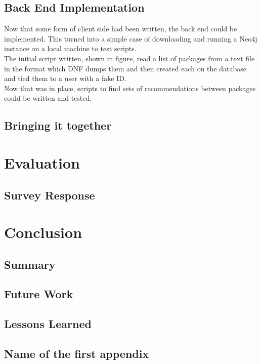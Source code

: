 \documentclass{l4proj}
\begin{document}
\section{Back End Implementation}
Now that some form of client side had been written, the back end could be implemented. This turned into a simple case of downloading and running a Neo4j instance on a local machine to test scripts.\\
The initial script written, shown in figure, read a list of packages from a text file in the format which DNF dumps them and then created each on the database and tied them to a user with a fake ID.\\
Now that was in place, scripts to find sets of recommendations between packages could be written and tested. 

\section{Bringing it together}
 
 
\chapter{Evaluation}
\section{Survey Response}
 
 
\chapter{Conclusion}
\section{Summary}
\section{Future Work}
\section{Lessons Learned}
 
 
\begin{appendices}
 
\chapter{Name of the first appendix}
 
\end{appendices}
 
 


\end{document}
